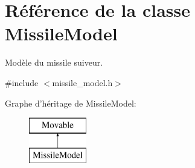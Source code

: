 \hypertarget{class_missile_model}{\section{Référence de la classe Missile\+Model}
\label{class_missile_model}
}


Modèle du missile suiveur.  




{\ttfamily \#include $<$missile\+\_\+model.\+h$>$}

Graphe d'héritage de Missile\+Model\+:\begin{figure}[H]
\begin{center}
\leavevmode
\includegraphics[height=2.000000cm]{class_missile_model}
\end{center}
\end{figure}
